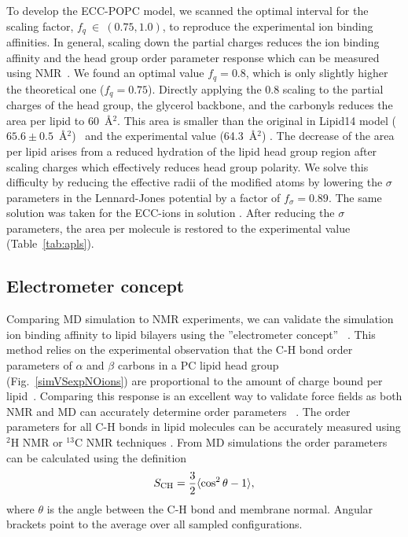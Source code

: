 \documentclass[aip,jcp,twocolumn]{revtex4}
\begin{document}
To develop the ECC-POPC model, we scanned the optimal interval for the scaling factor, $f_q~\in~(0.75, 1.0)$, to reproduce the experimental ion binding affinities. In general, scaling down the partial charges reduces the ion binding affinity and the head group order parameter response which can be measured using NMR~\cite{akutsu81, altenbach84, scherer89}. We found an optimal value $f_q = 0.8$, which is only slightly higher the theoretical one ($f_q=0.75$). Directly applying the 0.8 scaling to the partial charges of the head group, the glycerol backbone, and the carbonyls reduces the area per lipid to 60~\AA$^2$. This area is smaller than the original in Lipid14 model ($65.6 \pm 0.5$~\AA$^2$)~\cite{dickson14} and the experimental value (64.3~\AA$^2$) \cite{kucerka11}. The decrease of the area per lipid arises from a reduced hydration of the lipid head group region after scaling charges which effectively reduces head group polarity. 
We solve this difficulty by reducing the effective radii of the modified atoms by lowering the $\sigma$ parameters in the Lennard-Jones potential by a factor of $f_\sigma = 0.89$. The same solution was taken for the ECC-ions in solution \cite{kohagen14, kohagen16, Pluharova2014}. After reducing the $\sigma$ parameters, the area per molecule is restored to the experimental value (Table~\ref{tab:apls}). 




\subsection{Electrometer concept} \label{section:electrometer}
Comparing MD simulation to NMR experiments, we can validate the simulation ion binding affinity to lipid bilayers using the ''electrometer concept''~ \cite{seelig87, catte16}. This method relies on the experimental observation that the C-H bond order parameters of $\alpha$ and $\beta$ carbons in a PC lipid head group (Fig.~\ref{simVSexpNOions}) are proportional to the amount of charge bound per lipid~\cite{seelig87}. Comparing this response is an excellent way to validate force fields as both NMR and MD can accurately determine order parameters ~\cite{catte16, ollila16}. The order parameters for all C-H bonds in lipid molecules can be accurately measured using $^2$H NMR or $^{13}$C NMR techniques \cite{ollila16}. From MD simulations the order parameters can be calculated using the definition
\begin{equation}\label{OP}
S_{\rm CH}=\frac{3}{2}\langle \cos^2\theta -1 \rangle,
\end{equation}
where $\theta$ is the angle between the C-H bond and membrane normal. Angular brackets point to the average over all sampled configurations.
\end{document}

